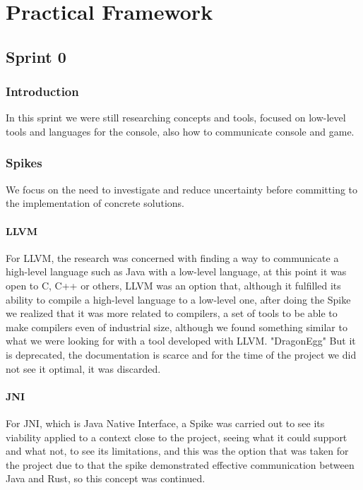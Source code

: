 \section{Practical Framework}


\subsection{Sprint 0}
\subsubsection{Introduction}
In this sprint we were still researching concepts and tools, focused on low-level tools and languages for the console, also how to communicate console and game.
\subsubsection{Spikes}
We focus on the need to investigate and reduce uncertainty before committing to the implementation of concrete solutions.
\paragraph{LLVM}
For LLVM, the research was concerned with finding a way to communicate a high-level language such as Java with a low-level language, at this point it was open to C, C++ or others, LLVM was an option that, although it fulfilled its ability to compile a high-level language to a low-level one, after doing the Spike we realized that it was more related to compilers, a set of tools to be able to make compilers even of industrial size, although we found something similar to what we were looking for with a tool developed with LLVM. "DragonEgg" But it is deprecated, the documentation is scarce and for the time of the project we did not see it optimal, it was discarded.
\paragraph{JNI}
For JNI, which is Java Native Interface, a Spike was carried out to see its viability applied to a context close to the project, seeing what it could support and what not, to see its limitations, and this was the option that was taken for the project due to that the spike demonstrated effective communication between Java and Rust, so this concept was continued.
